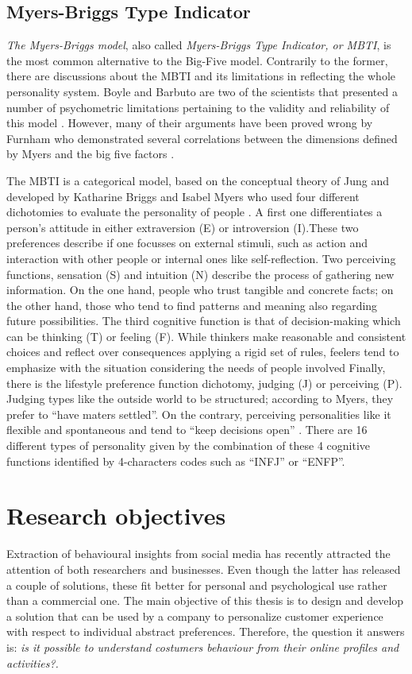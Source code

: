 \subsection{Myers-Briggs Type Indicator}
\label{sec:MBTI}
\textit{The Myers-Briggs model}, also called \textit{Myers-Briggs Type Indicator, or MBTI}, is the most common alternative to the Big-Five model.
Contrarily to the former, there are discussions about the MBTI and its limitations in reflecting the whole personality system. 
Boyle and Barbuto are two of the scientists that presented a number of psychometric limitations pertaining to the validity and reliability of this model \cite{boyle1995myers,barbuto1997critique}.
However, many of their arguments have been proved wrong by Furnham who demonstrated several correlations between the dimensions defined by Myers and the big five factors \cite{furnham1996big}.

The MBTI is a categorical model, based on the conceptual theory of Jung and developed by Katharine Briggs and Isabel Myers who used four different dichotomies to evaluate the personality of people \cite{jung1971personality}. 
A first one differentiates a person's attitude in either extraversion (E) or introversion (I).These two preferences describe if one focusses on external stimuli, such as action and interaction with other people or internal ones like self-reflection.
Two perceiving functions, sensation (S) and intuition (N) describe the process of gathering new information. On the one hand, people who trust tangible and concrete facts; on the other hand, those who tend to find patterns and meaning also regarding future possibilities.
The third cognitive function is that of decision-making which can be thinking (T) or feeling (F). While thinkers make reasonable and consistent choices and reflect over consequences applying a rigid set of rules, feelers tend to emphasize with the situation considering the needs of people involved
Finally, there is the lifestyle preference function dichotomy, judging (J) or perceiving (P). Judging types like the outside world to be structured; according to Myers, they prefer to ``have maters settled''. On the contrary, perceiving personalities like it flexible and spontaneous and tend to ``keep decisions open'' \cite{myers2010gifts}.
There are 16 different types of personality given by the combination of these 4 cognitive functions identified by 4-characters codes such as ``INFJ'' or ``ENFP''.

\section{Research objectives}
\label{sec:resObj}
Extraction of behavioural insights from social media has recently attracted the attention of both researchers and businesses.
Even though the latter has released a couple of solutions, these fit better for personal and psychological use rather than a commercial one.
The main objective of this thesis is to design and develop a solution that can be used by a company to personalize customer experience with respect to individual abstract preferences.
Therefore, the question it answers is: \textit{is it possible to understand costumers behaviour from their online profiles and activities?.}

